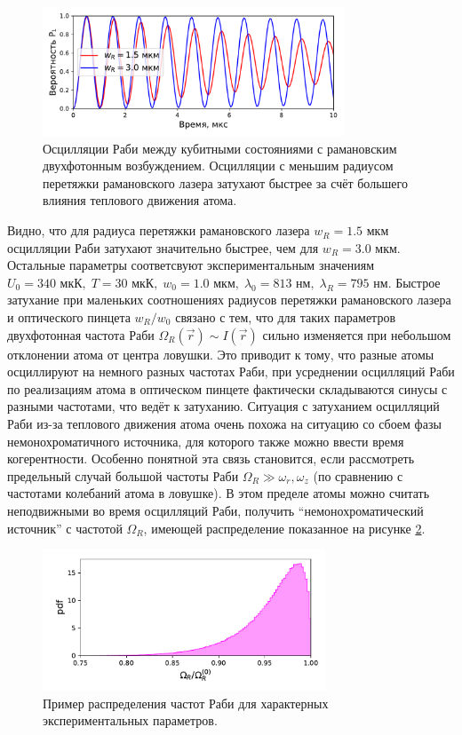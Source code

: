 \begin{figure}[ht]
	\centering
	\includegraphics[width=0.8\textwidth]{images/rabi_sample.pdf}
	\caption{Осцилляции Раби между кубитными состояниями с рамановским двухфотонным возбуждением. Осцилляции с меньшим радиусом перетяжки рамановского лазера затухают быстрее за счёт большего влияния теплового движения атома.}
	\label{fig:rabi_sample}
\end{figure}

Видно, что для радиуса перетяжки рамановского лазера $w_R = 1.5 \text{ мкм}$ осцилляции Раби затухают значительно быстрее, чем для $w_R = 3.0\text{ мкм}$. Остальные параметры соответсвуют экспериментальным значениям $U_0 = 340\text{ мкК}, \; T = 30\text{ мкК}, \; w_0 = 1.0\text{ мкм}, \; \lambda_0 = 813\text{ нм}, \; \lambda_{R} = 795 \text{ нм}$. Быстрое затухание при маленьких соотношениях радиусов перетяжки рамановского лазера и оптического пинцета $w_R/w_0$ связано с тем, что для таких параметров двухфотонная частота Раби $\Omega_{R}(\vec{r}) \sim I(\vec{r})$ сильно изменяется при небольшом отклонении атома от центра ловушки. Это приводит к тому, что разные атомы осциллируют на немного разных частотах Раби, при усреднении осцилляций Раби по реализациям атома в оптическом пинцете фактически складываются синусы с разными частотами, что ведёт к затуханию. Ситуация с затуханием осцилляций Раби из-за теплового движения атома очень похожа на ситуацию со сбоем фазы немонохроматичного источника, для которого также можно ввести время когерентности. Особенно понятной эта связь становится, если рассмотреть предельный случай большой частоты Раби $\Omega_{R} \gg \omega_r, \omega_z$ (по сравнению с частотами колебаний атома в ловушке). В этом пределе атомы можно считать неподвижными во время осцилляций Раби, получить ``немонохроматический источник'' с частотой $\Omega_{R}$, имеющей распределение показанное на рисунке \ref{fig:non_monochromatic}.

\begin{figure}[ht]
	\centering
	\includegraphics[width=0.75\textwidth]{images/non_monochromatic.pdf}
	\caption{Пример распределения частот Раби для характерных экспериментальных параметров.}
	\label{fig:non_monochromatic}
\end{figure}

